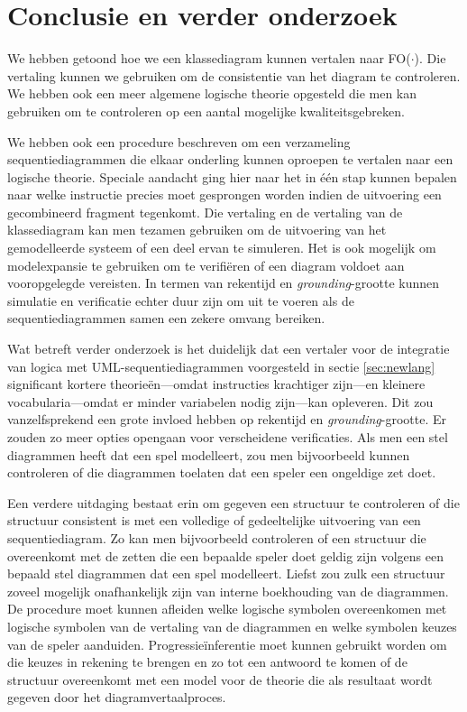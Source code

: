\chapter{Conclusie en verder onderzoek}\label{sec:conclusie}
We hebben getoond hoe we een klassediagram kunnen vertalen naar FO($\cdot$). Die vertaling kunnen we gebruiken om de consistentie van het diagram te controleren. We hebben ook een meer algemene logische theorie opgesteld die men kan gebruiken om te controleren op een aantal mogelijke kwaliteitsgebreken.

We hebben ook een procedure beschreven om een verzameling sequentiediagrammen die elkaar onderling kunnen oproepen te vertalen naar een logische theorie. Speciale aandacht ging hier naar het in \'e\'en stap kunnen bepalen naar welke instructie precies moet gesprongen worden indien de uitvoering een gecombineerd fragment tegenkomt. Die vertaling en de vertaling van de klassediagram kan men tezamen gebruiken om de uitvoering van het gemodelleerde systeem of een deel ervan te simuleren. Het is ook mogelijk om modelexpansie te gebruiken om te verifi\"eren of een diagram voldoet aan vooropgelegde vereisten. In termen van rekentijd en \textit{grounding}-grootte kunnen simulatie en verificatie echter duur zijn om uit te voeren als de sequentiediagrammen samen een zekere omvang bereiken.

Wat betreft verder onderzoek is het duidelijk dat een vertaler voor de integratie van logica met UML-sequentiediagrammen voorgesteld in sectie \ref{sec:newlang} significant kortere theorie\"en---omdat instructies krachtiger zijn---en kleinere vocabularia---omdat er minder variabelen nodig zijn---kan opleveren. Dit zou vanzelfsprekend een grote invloed hebben op rekentijd en \textit{grounding}-grootte. Er zouden zo meer opties opengaan voor verscheidene verificaties. Als men een stel diagrammen heeft dat een spel modelleert, zou men bijvoorbeeld kunnen controleren of die diagrammen toelaten dat een speler een ongeldige zet doet.

Een verdere uitdaging bestaat erin om gegeven een structuur te controleren of die structuur consistent is met een volledige of gedeeltelijke uitvoering van een sequentiediagram. Zo kan men bijvoorbeeld controleren of een structuur die overeenkomt met de zetten die een bepaalde speler doet geldig zijn volgens een bepaald stel diagrammen dat een spel modelleert. Liefst zou zulk een structuur zoveel mogelijk onafhankelijk zijn van interne boekhouding van de diagrammen. De procedure moet kunnen afleiden welke logische symbolen overeenkomen met logische symbolen van de vertaling van de diagrammen en welke symbolen keuzes van de speler aanduiden. Progressie\"inferentie moet kunnen gebruikt worden om die keuzes in rekening te brengen en zo tot een antwoord te komen of de structuur overeenkomt met een model voor de theorie die als resultaat wordt gegeven door het diagramvertaalproces.